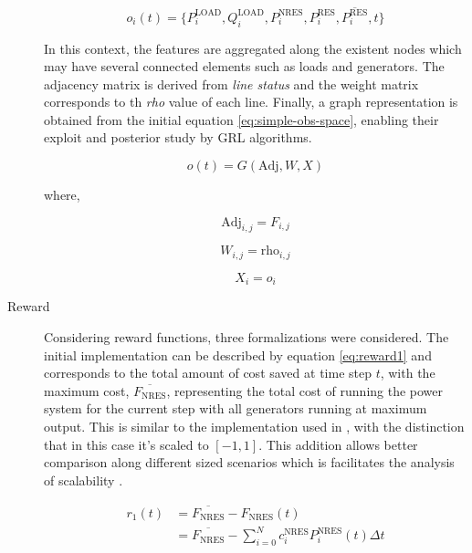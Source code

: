 \begin{description}
	\begin{equation} \label{eq:graph-obs-space}
		o_i(t) = \{P^\text{LOAD}_i, Q^\text{LOAD}_i, P^\text{NRES}_i, P^\text{RES}_i, \overline{P^\text{RES}_i}, t\}
	\end{equation}
	
	In this context, the features are aggregated along the existent nodes which may have several connected elements such as loads and generators. The adjacency matrix is derived from \textit{line status} and the weight matrix corresponds to th \textit{rho} value of each line. Finally, a graph representation is obtained from the initial equation \ref{eq:simple-obs-space}, enabling their exploit and posterior study by \ac{GRL} algorithms.
	
	\begin{equation}
		o(t) = G(\text{Adj}, W, X)
	\end{equation}
	
	where,
	
	\begin{equation}
		\text{Adj}_{i,j} = F_{i,j}
	\end{equation}
	
	\begin{equation}
		W_{i,j} = \text{rho}_{i,j}
	\end{equation}
	
	\begin{equation}
		X_i = o_i
	\end{equation}
	

	
	\item[Reward] Considering reward functions, three formalizations were considered. The initial implementation can be described by equation \ref{eq:reward1} and corresponds to the total amount of cost saved at time step $t$, with the maximum cost, $\overline{F_\text{NRES}}$, representing the total cost of running the power system for the current step with all generators running at maximum output. This is similar to the implementation used in \cite{liNovelGraphReinforcement2022, chenScalableGraphReinforcement2023}, with the distinction that in this case it's scaled to $[-1,1]$. This addition allows better comparison along different sized scenarios which is facilitates the analysis of scalability . \par
	
	
	\begin{equation} \label{eq:reward1}
		\begin{split}
			r_1(t) &= \overline{F_\text{NRES}} - F_\text{NRES}(t) \\
			&= \overline{F_\text{NRES}} - \sum^N_{i=0} c^\text{NRES}_i P^\text{NRES}_i(t) \Delta t
		\end{split}
	\end{equation}
	

\end{description}
